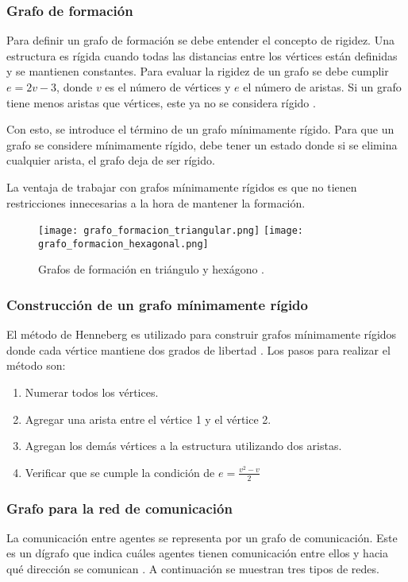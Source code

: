 \subsubsection*{Grafo de formación}
Para definir un grafo de formación se debe entender el concepto de rigidez. Una estructura es rígida cuando todas las distancias entre los vértices están definidas y se mantienen constantes. Para evaluar la rigidez de un grafo se debe cumplir $e = 2v - 3$, donde $v$ es el número de vértices y $e$ el número de aristas. Si un grafo tiene menos aristas que vértices, este ya no se considera rígido \cite{KrickL_2007_tesis}.

Con esto, se introduce el término de un grafo mínimamente rígido. Para que un grafo se considere mínimamente rígido, debe tener un estado donde si se elimina cualquier arista, el grafo deja de ser rígido.

La ventaja de trabajar con grafos mínimamente rígidos es que no tienen restricciones innecesarias a la hora de mantener la formación.

\begin{figure}[H]
	\centering
	\texttt{[image: grafo\_formacion\_triangular.png]}
	\texttt{[image: grafo\_formacion\_hexagonal.png]}
	\caption{Grafos de formación en triángulo y hexágono \cite{PenaAM_2019_tesis}.}
	\label{fig:grafos_formación}
\end{figure}

\subsubsection{Construcción de un grafo mínimamente rígido}
El método de Henneberg es utilizado para construir grafos mínimamente rígidos donde cada vértice mantiene dos grados de libertad \cite{KrickL_2007_tesis}. Los pasos para realizar el método son:

\begin{enumerate}
	\item Numerar todos los vértices.
	\item Agregar una arista entre el vértice 1 y el vértice 2.
	\item Agregan los demás vértices a la estructura utilizando dos aristas.
	\item Verificar que se cumple la condición de $e = \frac{v^2-v}{2}$
\end{enumerate}


\subsubsection*{Grafo para la red de comunicación}
La comunicación entre agentes se representa por un grafo de comunicación. Este es un dígrafo que indica cuáles agentes tienen comunicación entre ellos y hacia qué dirección se comunican \cite{grafos_en_redes_multiagente}. A continuación se muestran tres tipos de redes.

